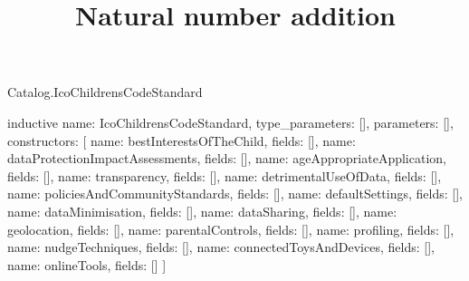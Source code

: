 \begin{lexlean}{Catalog.IcoChildrensCodeStandard}
\title{Natural number addition}
\begin{semanticmodule}
inductive{
  name: IcoChildrensCodeStandard,
  type_parameters: [],
  parameters: [],
  constructors: [
    {name: bestInterestsOfTheChild, fields: []},
    {name: dataProtectionImpactAssessments, fields: []},
    {name: ageAppropriateApplication, fields: []},
    {name: transparency, fields: []},
    {name: detrimentalUseOfData, fields: []},
    {name: policiesAndCommunityStandards, fields: []},
    {name: defaultSettings, fields: []},
    {name: dataMinimisation, fields: []},
    {name: dataSharing, fields: []},
    {name: geolocation, fields: []},
    {name: parentalControls, fields: []},
    {name: profiling, fields: []},
    {name: nudgeTechniques, fields: []},
    {name: connectedToysAndDevices, fields: []},
    {name: onlineTools, fields: []}
  ]
}
\end{semanticmodule}
\end{lexlean}
